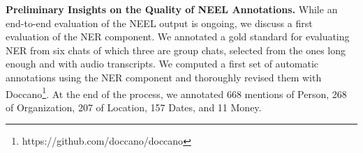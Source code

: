 

\textbf{Preliminary Insights on the Quality of NEEL Annotations.}
While an end-to-end evaluation of the NEEL output is ongoing, we discuss a first evaluation of the NER component. 
We annotated a gold standard for evaluating NER from six chats of which three are group chats, selected from the ones long enough and with audio transcripts. %
We computed a first set of automatic annotations using the NER component and thoroughly revised them with Doccano\footnote{https://github.com/doccano/doccano}. At the end of the process, we annotated 668 mentions of Person, 268 of Organization, 207 of Location, 157 Dates, and 11 Money.

